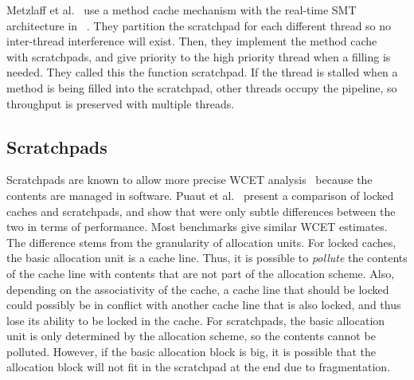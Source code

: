 Metzlaff et al.~\cite{Metzlaff2008MethodcacheSMIT} use a method cache mechanism with the real-time SMT architecture in ~\cite{Mische2008SMT}.
They partition the scratchpad for each different thread so no inter-thread interference will exist.   
Then, they implement the method cache~\cite{Kirner2007ModelFunctionCache} with scratchpads, and give priority to the high priority thread when a filling is needed.
They called this the function scratchpad.  
If the thread is stalled when a method is being filled into the scratchpad, other threads occupy the pipeline, so throughput is preserved with multiple threads. 

\subsection{Scratchpads}
Scratchpads are known to allow more precise WCET analysis~\cite{Wehmeyer2005SPM} because the contents are managed in software. 
Puaut et al.~\cite{Puaut2007SPMvsCache} present a comparison of locked caches and scratchpads, and show that were only subtle differences between the two in terms of performance. 
Most benchmarks give similar WCET estimates. 
The difference stems from the granularity of allocation units. 
For locked caches, the basic allocation unit is a cache line. 
Thus, it is possible to \emph{pollute} the contents of the cache line with contents that are not part of the allocation scheme. 
Also, depending on the associativity of the cache, a cache line that should be locked could possibly be in conflict with another cache line that is also locked, and thus lose its ability to be locked in the cache. 
For scratchpads, the basic allocation unit is only determined by the allocation scheme, so the contents cannot be polluted. 
However, if the basic allocation block is big, it is possible that the allocation block will not fit in the scratchpad at the end due to fragmentation.  
 
% 
% 

